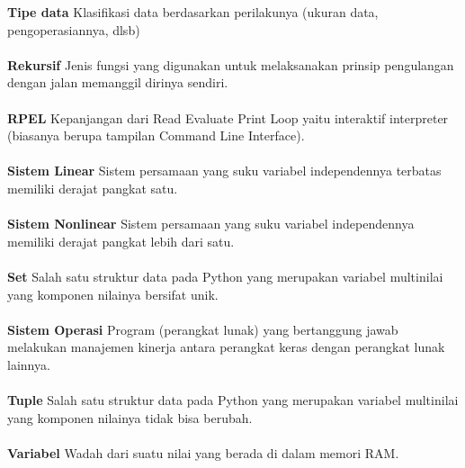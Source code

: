 \textbf{Tipe data} Klasifikasi data berdasarkan perilakunya (ukuran data, pengoperasiannya, dlsb)\\ \\
\textbf{Rekursif} Jenis fungsi yang digunakan untuk melaksanakan prinsip pengulangan dengan jalan memanggil dirinya sendiri.\\ \\
\textbf{RPEL} Kepanjangan dari Read Evaluate Print Loop yaitu interaktif interpreter (biasanya berupa tampilan Command Line Interface).\\ \\
\textbf{Sistem Linear} Sistem persamaan yang suku variabel independennya terbatas memiliki derajat pangkat satu.\\ \\
\textbf{Sistem Nonlinear} Sistem persamaan yang suku variabel independennya memiliki derajat pangkat lebih dari satu.\\ \\
\textbf{Set} Salah satu struktur data pada Python yang merupakan variabel multinilai yang komponen nilainya bersifat unik.\\ \\
\textbf{Sistem Operasi} Program (perangkat lunak) yang bertanggung jawab melakukan manajemen kinerja antara perangkat keras dengan perangkat lunak lainnya.\\ \\
\textbf{Tuple} Salah satu struktur data pada Python yang merupakan variabel multinilai yang komponen nilainya tidak bisa berubah.\\ \\
\textbf{Variabel} Wadah dari suatu nilai yang berada di dalam memori RAM.\\ \\

